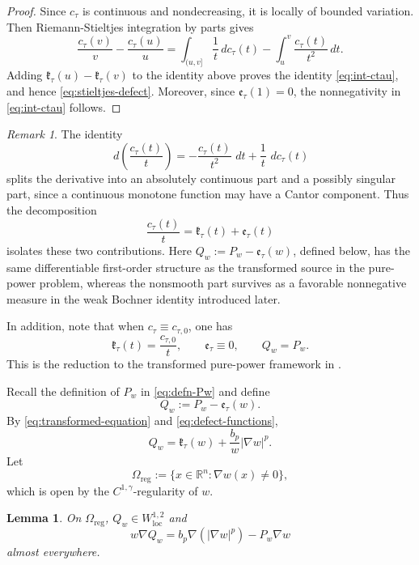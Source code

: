 \documentclass[reqno,12pt]{amsart}
\numberwithin{equation}{section}
\newtheorem{lem}[thm]{Lemma}
\theoremstyle{remark}
\newtheorem{rem}[thm]{Remark}
\newcommand{\R}{\mathbb R}
\newcommand{\dd}{\,d}
\newcommand{\loc}{\mathrm{loc}}
\begin{document}
\begin{proof}
Since $c_\tau$ is continuous and nondecreasing, it is locally of bounded variation. Then Riemann-Stieltjes integration by parts gives
$$
 \frac{c_\tau(v)}v-\frac{c_\tau(u)}u
 =\int_{(u,v]}\frac1t\dd c_\tau(t)  -\int_u^v\frac{c_\tau(t)}{t^2}\dd t.
$$
Adding $\mathfrak k_\tau(u)-\mathfrak k_\tau(v)$ to the identity above proves the identity  \eqref{eq:int-ctau}, and hence \eqref{eq:stieltjes-defect}.  Moreover, since $\mathfrak e_\tau(1)=0$, the nonnegativity in \eqref{eq:int-ctau} follows.
\end{proof}

\begin{rem}\label{rem:stieltjes-splitting}
The identity
$$
\dd\left(\frac{c_\tau(t)}{t}\right)
=-\frac{c_\tau(t)}{t^2}\,\dd t+\frac1t\,\dd c_\tau(t)
$$
splits the derivative into an absolutely continuous part and a possibly singular part, since a continuous monotone function may have a Cantor component. Thus the decomposition
$$
\frac{c_\tau(t)}t=\mathfrak k_\tau(t)+\mathfrak e_\tau(t)
$$
isolates these two contributions. Here
$Q_w:=P_w-\mathfrak e_\tau(w)$, defined below, has the same
differentiable first-order structure as the transformed source in the pure-power problem, whereas the nonsmooth part survives as a favorable nonnegative measure in the weak Bochner identity introduced later.

In addition, note that when $c_\tau\equiv c_{\tau, 0}$, one has
$$\mathfrak k_\tau(t)= \frac{c_{\tau, 0}} t, \qquad \mathfrak e_\tau\equiv 0, \qquad Q_w=P_w.$$
This is the reduction to the transformed pure-power framework in \cite{O2025}.
\end{rem}

Recall the definition of $P_w$ in \eqref{eq:defn-Pw} and define
\begin{equation}\label{eq:defn-Qw}
Q_w:=P_w-\mathfrak e_\tau(w).
\end{equation}
By \eqref{eq:transformed-equation} and \eqref{eq:defect-functions},
\begin{equation}\label{eq:Q-algebraic}
Q_w=\mathfrak k_\tau(w)+\frac{b_p}{w}|\nabla w|^p.
\end{equation}
Let
$$
\Omega_{\mathrm{reg}}:=\{x\in\R^n:\nabla w(x)\ne0\},
$$
which is open by the $C^{1,\gamma}$-regularity of $w$. 

\begin{lem} \label{lem:Q-derivative}
On $\Omega_{\mathrm{reg}}$, $Q_w\in W^{1,2}_{\loc}$ and
\begin{equation}\label{eq:Q-derivative}
w\nabla Q_w =b_p\nabla(|\nabla w|^p)-P_w\nabla w
\end{equation}
almost everywhere.
\end{lem}
\end{document}
